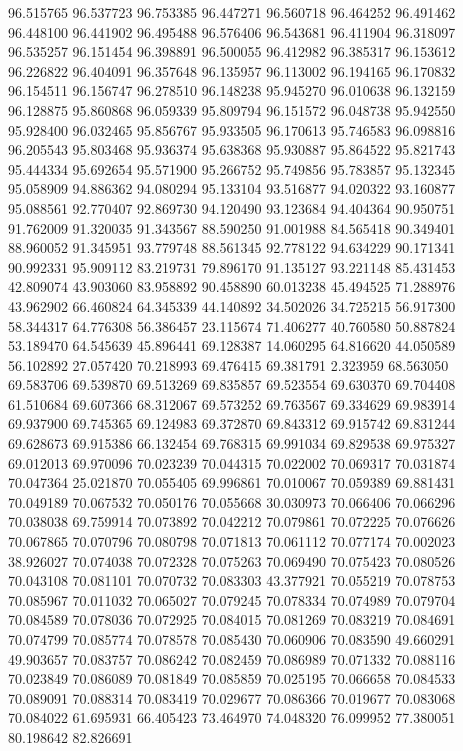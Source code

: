 96.515765
96.537723
96.753385
96.447271
96.560718
96.464252
96.491462
96.448100
96.441902
96.495488
96.576406
96.543681
96.411904
96.318097
96.535257
96.151454
96.398891
96.500055
96.412982
96.385317
96.153612
96.226822
96.404091
96.357648
96.135957
96.113002
96.194165
96.170832
96.154511
96.156747
96.278510
96.148238
95.945270
96.010638
96.132159
96.128875
95.860868
96.059339
95.809794
96.151572
96.048738
95.942550
95.928400
96.032465
95.856767
95.933505
96.170613
95.746583
96.098816
96.205543
95.803468
95.936374
95.638368
95.930887
95.864522
95.821743
95.444334
95.692654
95.571900
95.266752
95.749856
95.783857
95.132345
95.058909
94.886362
94.080294
95.133104
93.516877
94.020322
93.160877
95.088561
92.770407
92.869730
94.120490
93.123684
94.404364
90.950751
91.762009
91.320035
91.343567
88.590250
91.001988
84.565418
90.349401
88.960052
91.345951
93.779748
88.561345
92.778122
94.634229
90.171341
90.992331
95.909112
83.219731
79.896170
91.135127
93.221148
85.431453
42.809074
43.903060
83.958892
90.458890
60.013238
45.494525
71.288976
43.962902
66.460824
64.345339
44.140892
34.502026
34.725215
56.917300
58.344317
64.776308
56.386457
23.115674
71.406277
40.760580
50.887824
53.189470
64.545639
45.896441
69.128387
14.060295
64.816620
44.050589
56.102892
27.057420
70.218993
69.476415
69.381791
2.323959
68.563050
69.583706
69.539870
69.513269
69.835857
69.523554
69.630370
69.704408
61.510684
69.607366
68.312067
69.573252
69.763567
69.334629
69.983914
69.937900
69.745365
69.124983
69.372870
69.843312
69.915742
69.831244
69.628673
69.915386
66.132454
69.768315
69.991034
69.829538
69.975327
69.012013
69.970096
70.023239
70.044315
70.022002
70.069317
70.031874
70.047364
25.021870
70.055405
69.996861
70.010067
70.059389
69.881431
70.049189
70.067532
70.050176
70.055668
30.030973
70.066406
70.066296
70.038038
69.759914
70.073892
70.042212
70.079861
70.072225
70.076626
70.067865
70.070796
70.080798
70.071813
70.061112
70.077174
70.002023
38.926027
70.074038
70.072328
70.075263
70.069490
70.075423
70.080526
70.043108
70.081101
70.070732
70.083303
43.377921
70.055219
70.078753
70.085967
70.011032
70.065027
70.079245
70.078334
70.074989
70.079704
70.084589
70.078036
70.072925
70.084015
70.081269
70.083219
70.084691
70.074799
70.085774
70.078578
70.085430
70.060906
70.083590
49.660291
49.903657
70.083757
70.086242
70.082459
70.086989
70.071332
70.088116
70.023849
70.086089
70.081849
70.085859
70.025195
70.066658
70.084533
70.089091
70.088314
70.083419
70.029677
70.086366
70.019677
70.083068
70.084022
61.695931
66.405423
73.464970
74.048320
76.099952
77.380051
80.198642
82.826691
